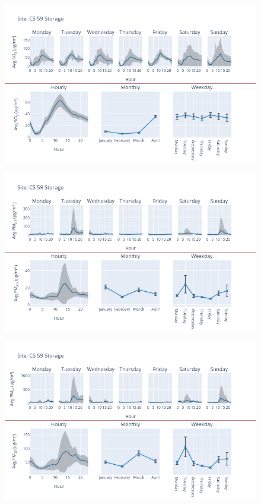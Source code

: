 \documentclass[12pt, oneside]{book}
\begin{document}
{ 
{\begin{figure}[H] 
 \centering 
\includegraphics[width=.88\textwidth, keepaspectratio]{image65} 
 \end{figure}}{} 

{\begin{figure}[H] 
 \centering 
\includegraphics[width=.88\textwidth, keepaspectratio]{image66} 
 \end{figure}}{} 

{\begin{figure}[H] 
 \centering 
\includegraphics[width=.88\textwidth, keepaspectratio]{image67} 
 \end{figure}}{} 

}
\end{document}
